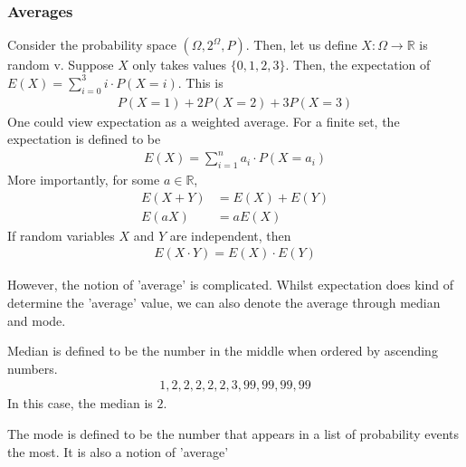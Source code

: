 \documentclass[a4paper]{article}
\theoremstyle{plain}
\theoremstyle{definition}
\newtheorem{defn}{Definition}[section]
\theoremstyle{remark}
\begin{document}
\subsubsection{Averages}
\begin{tcolorbox}[colback=black!3!white,colframe=black!60!white,title=\begin{defn}Expectation \label{Expectation}\end{defn}]
Consider the probability space $(\Omega, 2^{\Omega}, P)$. Then, let us define $X : \Omega \to \mathbb{R}$ is random v. Suppose $X$ only takes values $\{ 0,1,2,3\}$. Then, the expectation of $E(X) = \sum_{i=0}^{3} i\cdot P(X=i)$. This is 
\begin{align}
	P(X=1) + 2 P(X=2) + 3 P(X=3)
\end{align}
One could view expectation as a weighted average. For a finite set, the expectation is defined to be
\begin{align}
	E(X) = \sum_{i=1}^{n} a_i \cdot P(X=a_i)
\end{align}
More importantly, for some $a \in \mathbb{R}$, 
\begin{align*}
	E(X+Y) &= E(X) + E(Y) \\
	E(aX) &= aE(X)
\end{align*}
	If random variables $X$ and $Y$ are independent, then
	\begin{align*}
		E(X \cdot Y) = E(X) \cdot E(Y)
	\end{align*}
\end{tcolorbox}
However, the notion of 'average' is complicated. Whilst expectation does kind of determine the 'average' value, we can also denote the average through median and mode.
\begin{tcolorbox}[colback=black!3!white,colframe=black!60!white,title=\begin{defn}Median \label{Median}\end{defn}]
Median is defined to be the number in the middle when ordered by ascending numbers.
\begin{align}
1,2,2,2,2,2,3,99,99,99,99
\end{align}
In this case, the median is $2$. 
\end{tcolorbox}
\begin{tcolorbox}[colback=black!3!white,colframe=black!60!white,title=\begin{defn}Mode \label{Mode}\end{defn}]
The mode is defined to be the number that appears in a list of probability events the most. It is also a notion of 'average'
\end{tcolorbox}
\end{document}
